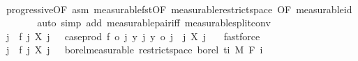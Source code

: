\begin{isabellebody}
\ \ \ \ \isamarkupfalse%
\ progressive{\isacharbrackleft}{\kern0pt}OF\ asm{\isacharbrackright}{\kern0pt}\ measurable{\isacharunderscore}{\kern0pt}fst{\isacharprime}{\kern0pt}{\isacharprime}{\kern0pt}{\isacharbrackleft}{\kern0pt}OF\ measurable{\isacharunderscore}{\kern0pt}restrict{\isacharunderscore}{\kern0pt}space{}{\isacharcomma}{\kern0pt}\ OF\ measurable{\isacharunderscore}{\kern0pt}id{\isacharbrackright}{\kern0pt}\ \isanewline
\ \ \ \ \isamarkupfalse%
\ {\isacharparenleft}{\kern0pt}auto\ simp\ add{\isacharcolon}{\kern0pt}\ measurable{\isacharunderscore}{\kern0pt}pair{\isacharunderscore}{\kern0pt}iff\ measurable{\isacharunderscore}{\kern0pt}split{\isacharunderscore}{\kern0pt}conv{\isacharparenright}{\kern0pt}\isanewline
\ \ \isamarkupfalse%
\ \isamarkupfalse%
\ {\isachardoublequoteopen}{\isacharparenleft}{\kern0pt}{\isasymlambda}{\isacharparenleft}{\kern0pt}j{\isacharcomma}{\kern0pt}\ {\isasymxi}{\isacharparenright}{\kern0pt}{\isachardot}{\kern0pt}\ f\ j\ {\isacharparenleft}{\kern0pt}X\ j\ {\isasymxi}{\isacharparenright}{\kern0pt}{\isacharparenright}{\kern0pt}\ {\isacharequal}{\kern0pt}\ case{\isacharunderscore}{\kern0pt}prod\ f\ o\ {\isacharparenleft}{\kern0pt}{\isacharparenleft}{\kern0pt}{\isasymlambda}{\isacharparenleft}{\kern0pt}j{\isacharcomma}{\kern0pt}\ y{\isacharparenright}{\kern0pt}{\isachardot}{\kern0pt}\ {\isacharparenleft}{\kern0pt}j{\isacharcomma}{\kern0pt}\ y{\isacharparenright}{\kern0pt}{\isacharparenright}{\kern0pt}\ o\ {\isacharparenleft}{\kern0pt}{\isasymlambda}{\isacharparenleft}{\kern0pt}j{\isacharcomma}{\kern0pt}\ {\isasymxi}{\isacharparenright}{\kern0pt}{\isachardot}{\kern0pt}\ {\isacharparenleft}{\kern0pt}j{\isacharcomma}{\kern0pt}\ X\ j\ {\isasymxi}{\isacharparenright}{\kern0pt}{\isacharparenright}{\kern0pt}{\isacharparenright}{\kern0pt}{\isachardoublequoteclose}\ \isamarkupfalse%
\ fastforce\isanewline
\ \ \isamarkupfalse%
\ \isamarkupfalse%
\ {\isachardoublequoteopen}{\isacharparenleft}{\kern0pt}{\isasymlambda}{\isacharparenleft}{\kern0pt}j{\isacharcomma}{\kern0pt}\ {\isasymxi}{\isacharparenright}{\kern0pt}{\isachardot}{\kern0pt}\ {\isacharparenleft}{\kern0pt}f\ j{\isacharparenright}{\kern0pt}\ {\isacharparenleft}{\kern0pt}X\ j\ {\isasymxi}{\isacharparenright}{\kern0pt}{\isacharparenright}{\kern0pt}\ {\isasymin}\ borel{\isacharunderscore}{\kern0pt}measurable\ {\isacharparenleft}{\kern0pt}restrict{\isacharunderscore}{\kern0pt}space\ borel\ {\isacharbraceleft}{\kern0pt}ti{\isacharbraceright}{\kern0pt}\ {\isasymOtimes}\isactrlsub M\ F\ i{\isacharparenright}{\kern0pt}{\isachardoublequoteclose}\ \isamarkupfalse%

\end{isabellebody}

